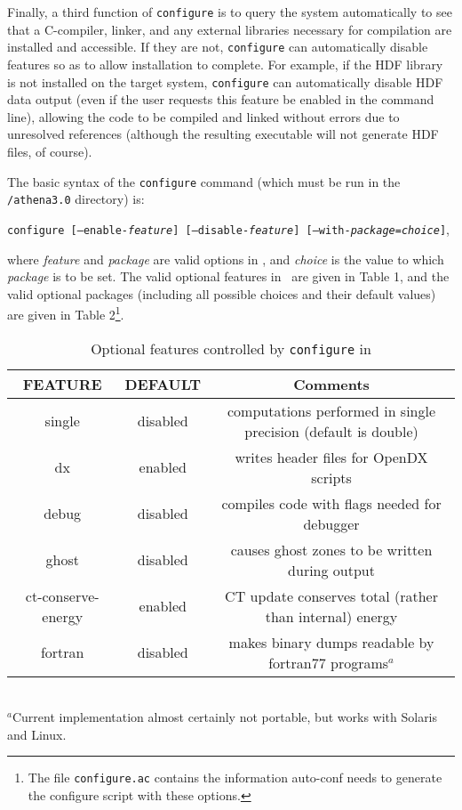 Finally, a third function of {\tt configure} is to query the system
automatically to see that a C-compiler, linker, and any external
libraries necessary for compilation are installed and accessible.
If they are not, {\tt configure} can automatically disable features so as
to allow installation to complete.  For example, if the HDF library is
not installed on the target system, {\tt configure} can automatically disable
HDF data output (even if the user requests this feature be enabled in
the command line), allowing the code to be compiled and linked without
errors due to unresolved references (although the resulting executable
will not generate HDF files, of course).

The basic syntax of the {\tt configure} command (which must be run
in the {\tt /athena3.0} directory) is:
\begin{center}
{\tt configure [--enable-{\it feature}] [--disable-{\it feature}]
[--with-{\it package}={\it choice}]},
\end{center}
where {\it feature} and {\it package}
are valid options in \ath, and {\it choice} is the value to which
{\it package} is to be set.  The valid optional features in \ath\ are given in
Table 1, and the valid optional packages (including all possible choices and
their default values) are given in Table 2\footnote{The file {\tt configure.ac}
contains the information auto-conf needs to generate the configure script
with these options.}.

\begin{table}[ht]
\caption{Optional features controlled by {\tt configure} in \ath}
\begin{tabular}{|c|c|c|} \hline \hline
FEATURE & DEFAULT & Comments \\ \hline
single &  disabled & computations performed in single precision (default is double) \\
dx  & enabled & writes header files for OpenDX scripts \\
debug  & disabled & compiles code with flags needed for debugger \\
ghost  & disabled & causes ghost zones to be written during output \\
ct-conserve-energy  & enabled & CT update conserves total (rather than internal) energy \\
fortran & disabled & makes binary dumps readable by fortran77 programs$^{a}$
\\ \hline
\end{tabular}
\\$^{a}$Current implementation almost certainly not portable, but works
with Solaris and Linux.
\end{table}


